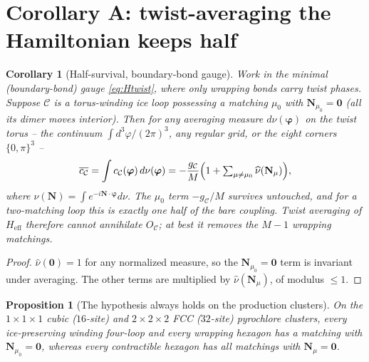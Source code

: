 \documentclass[11pt,letterpaper]{article}
\newcommand{\bvarphi}{\bm{\varphi}}
\newcommand{\bN}{\mathbf{N}}
\newcommand{\Heff}{H_{\mathrm{eff}}}
\theoremstyle{plain}
\newtheorem{corollary}{Corollary}
\newtheorem{proposition}{Proposition}
\theoremstyle{definition}
\begin{document}
\section{Corollary A: twist-averaging the Hamiltonian keeps half}
\label{sec:cor-half}

\begin{corollary}[Half-survival, boundary-bond gauge]
\label{cor:half}
Work in the minimal (boundary-bond) gauge \eqref{eq:Htwist}, where only
wrapping bonds carry twist phases. Suppose $\mathcal C$ is a torus-winding
ice loop possessing a matching $\mu_0$ with $\bN_{\mu_0}=\bm 0$ (all its
dimer moves interior). Then
for \emph{any} averaging measure $d\nu(\bvarphi)$ on the twist torus --
the continuum $\int d^3\varphi/(2\pi)^3$, any regular grid, or the eight
corners $\{0,\pi\}^3$ --
\begin{equation}
\overline{c_{\mathcal C}}
=\int c_{\mathcal C}(\bvarphi)\,d\nu(\bvarphi)
= -\frac{g_{\mathcal C}}{M}\Bigl(1+\textstyle\sum_{\mu\ne\mu_0}
\widehat{\nu}(\bN_\mu)\Bigr),
\end{equation}
where $\widehat\nu(\bN)=\int e^{-i\bN\cdot\bvarphi}d\nu$. The $\mu_0$
term $-g_{\mathcal C}/M$ survives untouched, and for a two-matching loop
this is exactly one half of the bare coupling. Twist averaging of
$\Heff$ therefore cannot annihilate $O_{\mathcal C}$; at best it removes
the $M-1$ wrapping matchings.
\end{corollary}

\begin{proof}
$\widehat\nu(\bm0)=1$ for any normalized measure, so the $\bN_{\mu_0}=\bm
0$ term is invariant under averaging. The other terms are multiplied by
$\widehat\nu(\bN_\mu)$, of modulus $\le1$.
\end{proof}

\begin{proposition}[The hypothesis always holds on the production clusters]
\label{prop:census}
On the $1{\times}1{\times}1$ cubic ($16$-site) and $2{\times}2{\times}2$
FCC ($32$-site) pyrochlore clusters, every ice-preserving winding
four-loop and every wrapping hexagon has a matching with
$\bN_{\mu_0}=\bm0$, whereas every contractible hexagon has \emph{all}
matchings with $\bN_\mu=\bm0$.
\end{proposition}
\end{document}
